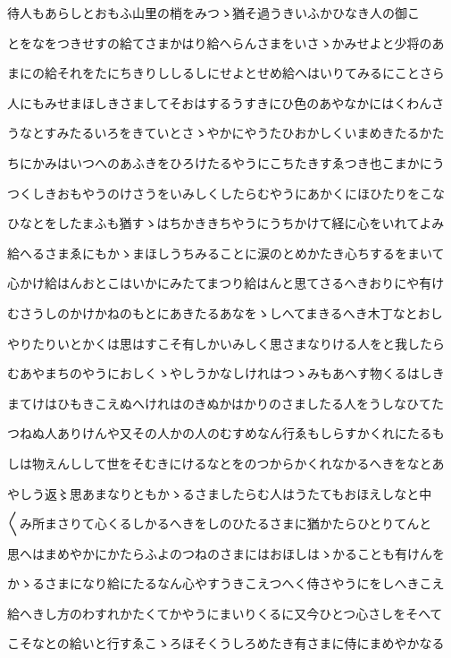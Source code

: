 \documentclass[a4paper,11pt,landscape]{ltjtarticle}
\begin{document}
待人もあらしとおもふ山里の梢をみつゝ猶そ過うきいふかひなき人の御こ
\par\medskip
とをなをつきせすの給てさまかはり給へらんさまをいさゝかみせよと少将のあ
\par\medskip
まにの給それをたにちきりししるしにせよとせめ給へはいりてみるにことさら
\par\medskip
人にもみせまほしきさましてそおはするうすきにひ色のあやなかにはくわんさ
\par\medskip
うなとすみたるいろをきていとさゝやかにやうたひおかしくいまめきたるかた
\par\medskip
ちにかみはいつへのあふきをひろけたるやうにこちたきすゑつき也こまかにう
\par\medskip
つくしきおもやうのけさうをいみしくしたらむやうにあかくにほひたりをこな
\par\medskip
ひなとをしたまふも猶すゝはちかききちやうにうちかけて経に心をいれてよみ
\par\medskip
給へるさまゑにもかゝまほしうちみることに涙のとめかたき心ちするをまいて
\par\medskip
心かけ給はんおとこはいかにみたてまつり給はんと思てさるへきおりにや有け
\par\medskip
むさうしのかけかねのもとにあきたるあなをゝしへてまきるへき木丁なとおし
\par\medskip
やりたりいとかくは思はすこそ有しかいみしく思さまなりける人をと我したら
\par\medskip
むあやまちのやうにおしくゝやしうかなしけれはつゝみもあへす物くるはしき
\par\medskip
まてけはひもきこえぬへけれはのきぬかはかりのさましたる人をうしなひてた
\par\medskip
つねぬ人ありけんや又その人かの人のむすめなん行ゑもしらすかくれにたるも
\par\medskip
しは物えんしして世をそむきにけるなとをのつからかくれなかるへきをなとあ
\par\medskip
やしう返〻思あまなりともかゝるさましたらむ人はうたてもおほえしなと中
\par\medskip
〱み所まさりて心くるしかるへきをしのひたるさまに猶かたらひとりてんと
\par\medskip
思へはまめやかにかたらふよのつねのさまにはおほしはゝかることも有けんを
\par\medskip
かゝるさまになり給にたるなん心やすうきこえつへく侍さやうにをしへきこえ
\par\medskip
給へきし方のわすれかたくてかやうにまいりくるに又今ひとつ心さしをそへて
\par\medskip
こそなとの給いと行すゑこゝろほそくうしろめたき有さまに侍にまめやかなる
\end{document}
